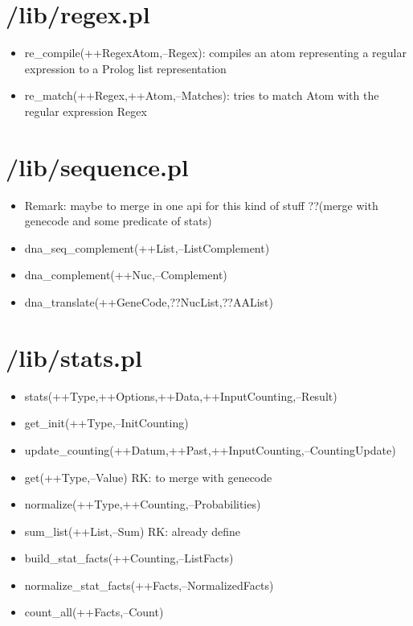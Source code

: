 \section{/lib/regex.pl}
%
\begin{itemize}
\item re\_compile(++RegexAtom,--Regex): compiles an atom representing a regular expression to a Prolog list representation
\item re\_match(++Regex,++Atom,--Matches): tries to match Atom with the regular expression Regex
\end{itemize}

\section{/lib/sequence.pl}
%
\begin{itemize}
\item Remark: maybe to merge in one api for this kind of stuff ??(merge with genecode and some predicate of stats)
\item dna\_seq\_complement(++List,--ListComplement)
\item dna\_complement(++Nuc,--Complement)
\item dna\_translate(++GeneCode,??NucList,??AAList)
\end{itemize}

\section{/lib/stats.pl}
%
\begin{itemize}
\item stats(++Type,++Options,++Data,++InputCounting,--Result)
\item get\_init(++Type,--InitCounting)
\item update\_counting(++Datum,++Past,++InputCounting,--CountingUpdate) 
\item get(++Type,--Value)  RK: to merge with genecode
\item normalize(++Type,++Counting,--Probabilities)
\item sum\_list(++List,--Sum) RK: already define
\item build\_stat\_facts(++Counting,--ListFacts)
\item normalize\_stat\_facts(++Facts,--NormalizedFacts)
\item count\_all(++Facts,--Count)
\end{itemize}


